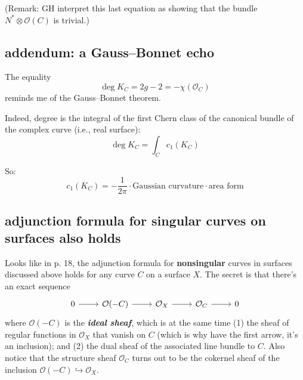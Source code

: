 (Remark: GH interpret this last equation as showing that the bundle \( N^* \otimes \mathcal{O}(C) \) is trivial.)


\subsection*{addendum: a Gauss–Bonnet echo}

The equality
\[
\deg K_C = 2g - 2 = -\chi(\mathcal{O}_C)
\]
reminds me of the Gauss–Bonnet theorem.

Indeed, degree is the integral of the first Chern class of the canonical bundle of the complex curve (i.e., real surface):
\[
\deg K_C = \int_C c_1(K_C)
\]

So:
\[
c_1(K_C) = -\frac{1}{2\pi} \cdot \text{Gaussian curvature} \cdot \text{area form}
\]
\subsection{adjunction formula for singular curves on surfaces also holds}

Looks like in \cite{huk} p. 18, the adjunction formula for \textbf{nonsingular}  curves in surfaces discussed above holds for any curve \(C\) on a surface \(X\). The secret is that there's an exact sequence
\[\begin{tikzcd}0\arrow[r]&\mathcal{O}(-C)\arrow[r]&\mathcal{O}_X\arrow[r]&\mathcal{O}_C\arrow[r]&0\end{tikzcd}\]
where \(\mathcal{O}(-C)\) is the \textit{\textbf{ideal sheaf}}, which is at the same time (1) the sheaf of regular functions in \(\mathcal{O}_X\) that vanish on \(C\) (which is why have the first arrow, it's an inclusion); and (2) the dual sheaf of the associated line bundle to \(C\). Also notice that the structure sheaf \(\mathcal{O}_C\) turns out to be the cokernel sheaf of the inclusion \(\mathcal{O}(-C) \hookrightarrow  \mathcal{O}_X\).

